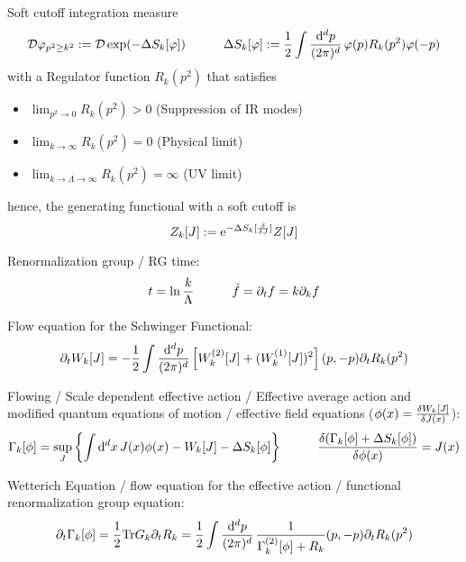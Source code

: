 		\noindent
		Soft cutoff integration measure
		\begin{equation}
			\mathcal{D}\varphi_{p^2 \ge k^2} := \mathcal{D} \exp(-\Delta S_k[\varphi])
			\hspace{30pt} \Delta S_k[\varphi] := \frac{1}{2} \int \frac{\dd^d p}{(2\pi)^d}\, \varphi(p)R_k(p^2) \varphi(-p)
		\end{equation}
		with a Regulator function $R_k(p^2)$ that satisfies
		\begin{itemize}\itemsep -0pt
			\item $\displaystyle\lim_{p^2 \to 0} R_k(p^2) > 0$ \hfill{(Suppression of IR modes)}
			\item $\displaystyle\lim_{k \to \infty} R_k(p^2) = 0$ \hfill{(Physical limit)}
			\item $\displaystyle\lim_{k \to \Lambda \to \infty} R_k(p^2) = \infty$ \hfill{(UV limit)}
		\end{itemize}
		hence, the generating functional with a soft cutoff is
		\begin{equation}
			Z_k[J] := \ex^{-\Delta S_k [\fdv{J}]}Z[J]
		\end{equation}

		\noindent
		Renormalization group / RG time:
		\begin{equation}
			t = \ln \frac{k}{\Lambda}
			\hspace{30pt} \dot{f} = \partial_t f = k \partial_k f
		\end{equation}

		\noindent
		Flow equation for the Schwinger Functional:
		\begin{equation}
			\partial_t W_k[J] = -\frac{1}{2}\int \frac{\dd^d p}{(2\pi)^d} \, \qty[W^{(2)}_k[J]+(W_k^{(1)}[J])^2](p,-p) \partial_t R_k(p^2)
		\end{equation}

		\noindent
		Flowing / Scale dependent effective action / Effective average action and modified quantum equations of motion / effective field equations ($\phi(x)= \fdv{W_k[J]}{J(x)}$):
		\begin{equation}
			\Gamma_k[\phi] = \sup_J \qty{\int \dd^d x\, J(x) \phi(x) - W_k[J] - \Delta S_k[\phi]}
			\hsp \fdv{(\Gamma_k[\phi] + \Delta S_k[\phi])}{\phi(x)} = J(x)
		\end{equation}

		\noindent
		Wetterich Equation / flow equation for the effective action / functional renormalization group equation:
		\begin{equation}
			\partial_t \Gamma_k[\phi] = \frac{1}{2} \mathrm{Tr} G_k \partial_t R_k
			=\frac{1}{2} \int \frac{\dd^d p}{(2\pi)^d} \, \frac{1}{\Gamma^{(2)}_k[\phi] + R_k}(p,-p) \partial_t R_k(p^2)
		\end{equation}

